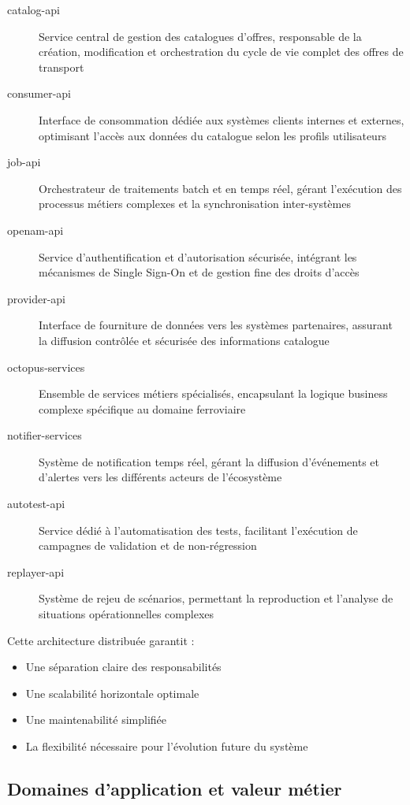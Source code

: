\begin{description}
    \item[catalog-api] Service central de gestion des catalogues d'offres, responsable de la création, modification et orchestration du cycle de vie complet des offres de transport
    \item[consumer-api] Interface de consommation dédiée aux systèmes clients internes et externes, optimisant l'accès aux données du catalogue selon les profils utilisateurs
    \item[job-api] Orchestrateur de traitements batch et en temps réel, gérant l'exécution des processus métiers complexes et la synchronisation inter-systèmes
    \item[openam-api] Service d'authentification et d'autorisation sécurisée, intégrant les mécanismes de Single Sign-On et de gestion fine des droits d'accès
    \item[provider-api] Interface de fourniture de données vers les systèmes partenaires, assurant la diffusion contrôlée et sécurisée des informations catalogue
    \item[octopus-services] Ensemble de services métiers spécialisés, encapsulant la logique business complexe spécifique au domaine ferroviaire
    \item[notifier-services] Système de notification temps réel, gérant la diffusion d'événements et d'alertes vers les différents acteurs de l'écosystème
    \item[autotest-api] Service dédié à l'automatisation des tests, facilitant l'exécution de campagnes de validation et de non-régression
    \item[replayer-api] Système de rejeu de scénarios, permettant la reproduction et l'analyse de situations opérationnelles complexes
\end{description}

Cette architecture distribuée garantit :
\begin{itemize}
    \item Une séparation claire des responsabilités
    \item Une scalabilité horizontale optimale
    \item Une maintenabilité simplifiée
    \item La flexibilité nécessaire pour l'évolution future du système
\end{itemize}

\subsection{Domaines d'application et valeur métier}

